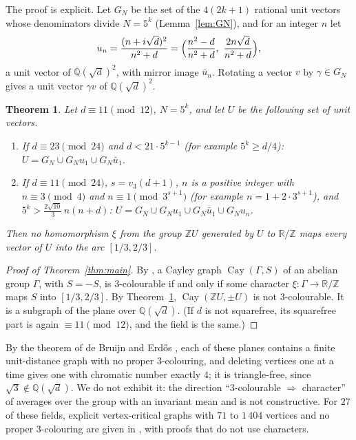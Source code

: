 \documentclass[11pt,a4paper]{amsart}
\newtheorem{theorem}{Theorem}
\theoremstyle{remark}
\newcommand{\Q}{\mathbb{Q}}
\newcommand{\R}{\mathbb{R}}
\newcommand{\Z}{\mathbb{Z}}
\newcommand{\Cay}{\operatorname{Cay}}
\begin{document}
The proof is explicit. Let $G_N$ be the set of the $4(2k+1)$ rational unit vectors whose denominators divide
$N=5^k$ (Lemma~\ref{lem:GN}), and for an integer $n$ let
\[
u_n=\frac{(n+i\sqrt d)^2}{n^2+d}=\Bigl(\frac{n^2-d}{n^2+d},\ \frac{2n\sqrt d}{n^2+d}\Bigr),
\]
a unit vector of $\Q(\sqrt d)^2$, with mirror image $\bar u_n$. Rotating a vector $v$ by $\gamma\in G_N$ gives a
unit vector $\gamma v$ of $\Q(\sqrt d)^2$.

\begin{theorem}\label{thm:sets}
Let $d\equiv11\pmod{12}$, $N=5^k$, and let $U$ be the following set of unit vectors.
\begin{enumerate}
\item If $d\equiv23\pmod{24}$ and $d<21\cdot5^{k-1}$ (for example $5^k\ge d/4$): $U=G_N\cup G_Nu_1\cup G_N\bar u_1$.
\item If $d\equiv11\pmod{24}$, $s=v_3(d+1)$, $n$ is a positive integer with $n\equiv3\pmod4$ and
$n\equiv1\pmod{3^{s+1}}$ (for example
$n=1+2\cdot3^{s+1}$), and $5^k>\frac{2\sqrt{10}}3\,n(n+d)$: $U=G_N\cup G_Nu_1\cup G_N\bar u_1\cup G_Nu_n$.
\end{enumerate}
Then no homomorphism $\xi$ from the group $\Z U$ generated by $U$ to $\R/\Z$ maps every vector of $U$ into the arc
$[1/3,2/3]$.
\end{theorem}

\begin{proof}[Proof of Theorem~\ref{thm:main}]
By \cite[Theorem~1]{Winding}, a Cayley graph $\Cay(\Gamma,S)$ of an abelian group $\Gamma$, with $S=-S$, is
$3$-colourable if and only if some character $\xi\colon\Gamma\to\R/\Z$ maps $S$ into $[1/3,2/3]$. By
Theorem~\ref{thm:sets}, $\Cay(\Z U,\pm U)$ is not $3$-colourable. It is a subgraph of the plane over $\Q(\sqrt d)$.
(If $d$ is not squarefree, its squarefree part is again $\equiv11\pmod{12}$, and the field is the same.)
\end{proof}

By the theorem of de Bruijn and Erd\H{o}s \cite{dBE}, each of these planes contains a finite unit-distance graph with no
proper $3$-colouring, and deleting vertices one at a time gives one with chromatic number exactly $4$; it is
triangle-free, since $\sqrt3\notin\Q(\sqrt d)$. We do not exhibit it: the
direction ``$3$-colourable $\Rightarrow$ character'' of \cite[Theorem~1]{Winding} averages over the group with an
invariant mean and is not constructive. For $27$ of these fields, explicit vertex-critical graphs with $71$ to
$1\,404$ vertices and no proper $3$-colouring are given in \cite{QP}, with proofs that do not use characters.
\end{document}

